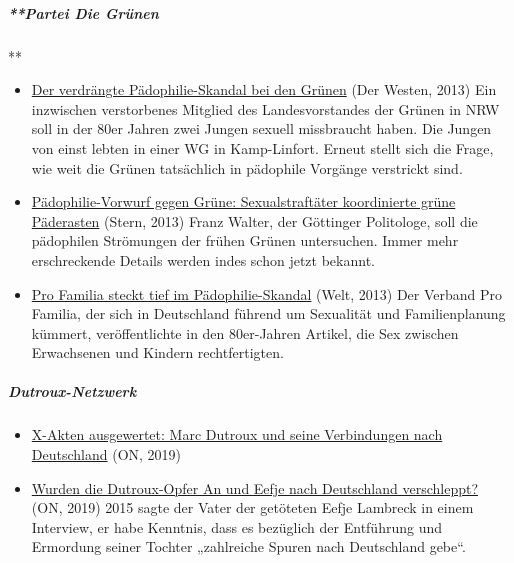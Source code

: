 \hypertarget{partei-die-gruxfcnen}{%
\subparagraph{**Partei Die Grünen}\label{partei-die-gruxfcnen}}

**

\begin{itemize}
\tightlist
\item
  \href{https://www.derwesten.de/politik/der-verdraengte-paedophilie-skandal-bei-den-gruenen-id8235519.html}{Der
  verdrängte Pädophilie-Skandal bei den Grünen} (Der Westen, 2013) Ein
  inzwischen verstorbenes Mitglied des Landesvorstandes der Grünen in
  NRW soll in der 80er Jahren zwei Jungen sexuell missbraucht haben. Die
  Jungen von einst lebten in einer WG in Kamp-Linfort. Erneut stellt
  sich die Frage, wie weit die Grünen tatsächlich in pädophile Vorgänge
  verstrickt sind.
\item
  \href{https://www.stern.de/politik/deutschland/paedophilie-vorwurf-gegen-gruene-sexualstraftaeter-koordinierte-gruene-paederasten-3384914.html}{Pädophilie-Vorwurf
  gegen Grüne: Sexualstraftäter koordinierte grüne Päderasten} (Stern,
  2013) Franz Walter, der Göttinger Politologe, soll die pädophilen
  Strömungen der frühen Grünen untersuchen. Immer mehr erschreckende
  Details werden indes schon jetzt bekannt.
\item
  \href{https://www.welt.de/politik/deutschland/article120742896/Pro-Familia-steckt-tief-im-Paedophilie-Skandal.html}{Pro
  Familia steckt tief im Pädophilie-Skandal} (Welt, 2013) Der Verband
  Pro Familia, der sich in Deutschland führend um Sexualität und
  Familienplanung kümmert, veröffentlichte in den 80er-Jahren Artikel,
  die Sex zwischen Erwachsenen und Kindern rechtfertigten.
\end{itemize}

\hypertarget{dutroux-netzwerk}{%
\subparagraph{\texorpdfstring{\textbf{Dutroux-Netzwerk}}{Dutroux-Netzwerk}}\label{dutroux-netzwerk}}

\begin{itemize}
\tightlist
\item
  \href{https://olivernevermind.wordpress.com/2019/09/22/x-akten-vollstaendig-ausgewertet-marc-dutroux-und-seine-verbindungen-nach-deutschland/}{X-Akten
  ausgewertet: Marc Dutroux und seine Verbindungen nach Deutschland}
  (ON, 2019)
\item
  \href{https://olivernevermind.wordpress.com/2019/09/20/neue-erkenntnisse-im-fall-dutroux-wurden-die-opfer-an-und-eefje-nach-deutschland-verschleppt/}{Wurden
  die Dutroux-Opfer An und Eefje nach Deutschland verschleppt?} (ON,
  2019) 2015 sagte der Vater der getöteten Eefje Lambreck in einem
  Interview, er habe Kenntnis, dass es bezüglich der Entführung und
  Ermordung seiner Tochter „zahlreiche Spuren nach Deutschland gebe``. 
\end{itemize}

